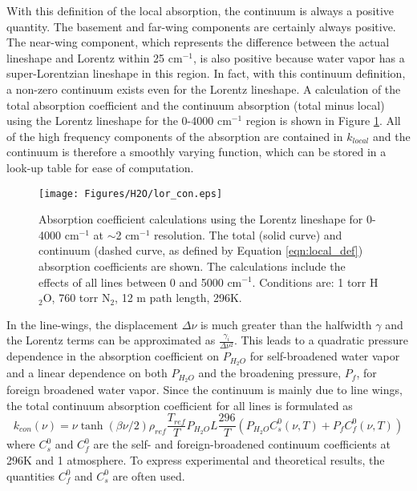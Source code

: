 \documentclass[11pt]{article}
\begin{document}
With this definition of the local absorption, the continuum is always a 
positive quantity.  The basement and far-wing
components are certainly always positive.  The near-wing component, which
represents the difference between the actual lineshape and Lorentz within
25 cm$^{-1}$, is also positive because water vapor has a super-Lorentzian
lineshape in this region. In fact, with this continuum definition, a 
non-zero continuum exists even for the Lorentz lineshape.
A calculation of the total absorption coefficient and the continuum 
absorption (total minus local) using the Lorentz lineshape for the 
0-4000 cm$^{-1}$ region is shown
in Figure \ref{fig:lor_con}.  All of the high frequency components of the
absorption are contained in $k_{local}$ and the continuum is therefore a 
smoothly varying function, which can be stored in a look-up table for ease 
of computation.

\begin{figure}[h]
\begin{center}
\texttt{[image: Figures/H2O/lor\_con.eps]}\end{center}
\caption[Lorentz calculations for 0-4000 cm$^{-1}$.]{Absorption coefficient
	calculations using the Lorentz lineshape for 0-4000 cm$^{-1}$ at
	$\sim$2 cm$^{-1}$ resolution.  The total
	(solid curve) and continuum (dashed curve, as defined by Equation 
	\protect\ref{eqn:local_def}) absorption coefficients are shown.  The
calculations include the effects of all lines between 0 and 5000 cm$^{-1}$.
Conditions are: 1 torr H$_2$O, 760 torr N$_2$, 12 m path length, 296K.}
\label{fig:lor_con}
\end{figure}

In the line-wings, the displacement $\Delta\nu$ is much greater than the
halfwidth $\gamma$ and the Lorentz terms can be approximated as 
$\frac{\gamma_i}{\Delta\nu^2}$.  This leads to a quadratic pressure
dependence in the absorption coefficient on $P_{H_2O}$ for self-broadened 
water vapor and a linear dependence on both $P_{H_2O}$ and the broadening 
pressure, $P_f$, for foreign broadened water vapor.  Since the continuum 
is mainly due to line wings, the total continuum absorption coefficient 
for all lines is formulated as \cite{bur:81,clo:89}
\begin{equation}
k_{con}(\nu)=\nu\tanh\left(\beta\nu/2\right) \rho_{ref}
\frac{T_{ref}}{T}P_{H_{2}O}L
\frac{296}{T}\left(P_{H_{2}O} C_s^0(\nu,T) + P_{f} C_f^0(\nu,T)\right)
\label{eqn:kcon}
\end{equation}
where $C_s^0$ and $C_f^0$ are the self- and foreign-broadened 
continuum coefficients at 296K and 1 atmosphere.  To express experimental
and theoretical results, the quantities $C_f^0$ and $C_s^0$ are often used.
\end{document}
